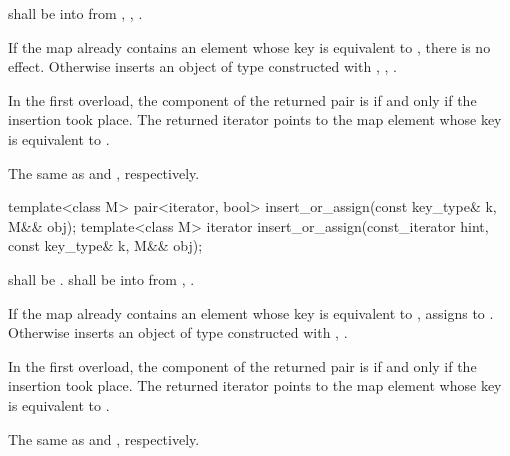 \begin{itemdescr}
\pnum
\requires
{} shall be  into 
from , ,
.

\pnum
\effects
If the map already contains an element
whose key is equivalent to ,
there is no effect.
Otherwise inserts an object of type 
constructed with , ,
.

\pnum
\returns
In the first overload,
the  component of the returned pair is 
if and only if the insertion took place.
The returned iterator points to the map element
whose key is equivalent to .

\pnum
\complexity
The same as  and ,
respectively.
\end{itemdescr}

%
\begin{itemdecl}
template<class M>
  pair<iterator, bool> insert_or_assign(const key_type& k, M&& obj);
template<class M>
  iterator insert_or_assign(const_iterator hint, const key_type& k, M&& obj);
\end{itemdecl}

\begin{itemdescr}
\pnum
\requires
{} shall be .
 shall be  into 
from , .

\pnum
\effects
If the map already contains an element 
whose key is equivalent to ,
assigns  to .
Otherwise inserts an object of type 
constructed with , .

\pnum
\returns
In the first overload,
the  component of the returned pair is 
if and only if the insertion took place.
The returned iterator points to the map element
whose key is equivalent to .

\pnum
\complexity
The same as  and ,
respectively.
\end{itemdescr}

